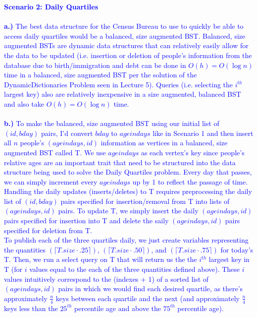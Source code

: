 \documentclass[11pt]{article}
\begin{document}
\begin{enumerate}
\textcolor{blue}{
\textbf{Scenario 2: Daily Quartiles} \\ \\
\textbf{a.)} The best data structure for the Census Bureau to use to quickly be able to access daily quartiles would be a balanced, size augmented BST. Balanced, size augmented BSTs are dynamic data structures that can relatively easily allow for the data to be updated (i.e. insertion or deletion of people's information from the database due to birth/immigration and debt can be done in $O(h) = O(\log{n})$ time in a balanced, size augmented BST per the solution of the DynamicDictionaries Problem seen in Lecture 5). Queries (i.e. selecting the $i^{th}$ largest key) also are relatively inexpensive in a size augmented, balanced BST and also take $O(h) = O(\log{n})$ time.  \\ \\
\textbf{b.)} To make the balanced, size augmented BST using our initial list of $(id, bday)$ pairs, I'd convert $bday$ to $ageindays$ like in Scenario 1 and then insert all $n$ people's $(ageindays, id)$ information as vertices in a balanced, size augmented BST called T. We use $ageindays$ as each vertex's key since people's relative ages are an important trait that need to be structured into the data structure being used to solve the Daily Quartiles problem. Every day that passes, we can simply increment every $ageindays$ up by 1 to reflect the passage of time. \\
Handling the daily updates (inserts/deletes) to T requires preprocessing the daily list of $(id, bday)$ pairs specified for insertion/removal from T into lists of $(ageindays, id)$ pairs. To update T, we simply insert the daily $(ageindays, id)$ pairs specified for insertion into T and delete the saily $(ageindays, id)$ pairs specified for deletion from T. \\
To publish each of the three quartiles daily, we just create variables representing the quantities $(\lceil T.size \cdot .25 \rceil)$, $(\lceil T.size \cdot .50 \rceil)$, and $(\lceil T.size \cdot .75 \rceil)$ for today's T. Then, we run a select query on T that will return us the the $i^{th}$ largest key in T (for $i$ values equal to the each of the three quantities defined above). These $i$ values intuitively correspond to the (indexes + 1) of a sorted list of $(ageindays, id)$ pairs in which we would find each desired quartile, as there's approximately $\frac{n}{4}$ keys between each quartile and the next (and approximately $\frac{n}{4}$ keys less than the $25^{th}$ percentile age and above the $75^{th}$ percentile age). \\ \\
}
\end{enumerate}
\end{document}

